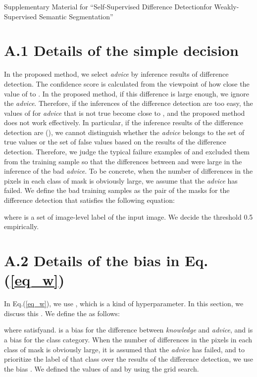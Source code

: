 \documentclass[10pt,twocolumn,letterpaper]{article}
\begin{document}
{\small


}

\setcounter{table}{0}
\renewcommand{\thetable}{A-\arabic{table}}

\newpage
\onecolumn
\noindent
{\huge Supplementary Material for ``Self-Supervised Difference Detectionfor Weakly-Supervised Semantic Segmentation''}

\section*{A.1 Details of the simple decision}
In the proposed method, we select {\it advice} by inference results of difference detection.
The confidence score is calculated from the viewpoint of how close the value of  to . 
In the proposed method, if this difference is large enough, we ignore the {\it advice}.
Therefore, if the inferences of the difference detection are too easy, the values of  for {\it advice} that is not true become close to , and the proposed method does not work effectively. 
In particular, if the inference results of the difference detection are (), we cannot distinguish whether the {\it advice} belongs to the set of true values  or the set of false values  based on the results of the difference detection.
Therefore, we judge the typical failure examples of  and excluded them from the training sample so that the differences between  and  were large in the inference of the bad {\it advice}.
To be concrete, when the number of differences in the pixels in each class of mask is obviously large, we assume that the {\it advice} has failed.
We define the bad training samples as the pair of the masks for the difference detection that satisfies the following equation:

where  is a set of image-level label of the input image.
We decide the threshold 0.5 empirically.


\section*{A.2 Details of the bias in Eq.(\ref{eq_w})}
In Eq.(\ref{eq_w}), we use , which is a kind of hyperparameter.
In this section, we discuss this .
We define the  as follows:
\footnotesize

\normalsize
where  satisfyand.
 is a bias for the difference between {\it knowledge} and {\it advice}, and  is a bias for the class category.
When the number of differences in the pixels in each class of mask is obviously large, it is assumed that the {\it advice} has failed, and to prioritize the label of that class over the results of the difference detection, we use the bias .
We defined the values of  and  by using the grid search.
\end{document}
